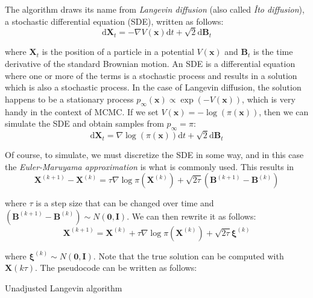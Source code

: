 \documentclass[12pt]{memoir}
\newcommand{\mb}{\mathbf}
\newcommand{\ti}{\textit}
\begin{document}
The algorithm draws its name from \ti{Langevin diffusion} (also called \ti{Îto diffusion}), a stochastic differential equation (SDE), written as follows:
\begin{equation}
    \mathrm{d}\mb X_t = -\nabla V(\mb x)\mathrm{d}t + \sqrt{2}\mathrm{d}\mb B_t
\end{equation}

where $\mb X_t$ is the position of a particle in a potential $V(\mb x)$ and $\mb B_t$ is the time derivative of the standard Brownian motion. An SDE is a differential equation where one or more of the terms is a stochastic process and results in a solution which is also a stochastic process. In the case of Langevin diffusion, the solution happens to be a stationary process $p_{\infty}(\mb x) \propto \exp(-V(\mb x))$, which is very handy in the context of MCMC. If we set $V(\mb x) = -\log(\pi(\mb x))$, then we can simulate the SDE and obtain samples from $p_\infty = \pi$:
\begin{equation}    
    \mathrm{d}\mb X_t = \nabla \log(\pi(\mb x))\mathrm{d}t + \sqrt{2}\mathrm{d}\mb B_t
\end{equation}


Of course, to simulate, we must discretize the SDE in some way, and in this case the \textit{Euler-Maruyama approximation} is what is commonly used. This results in
\begin{equation}
    \mb X^{(k+1)} - \mb X^{(k)} = \tau \nabla \log\pi(\mb X^{(k)}) + \sqrt{2\tau}(\mb B^{(k+1)} - \mb B^{(k)})
\end{equation}

where $\tau$ is a step size that can be changed over time and $(\mb B^{(k+1)} - \mb B^{(k)}) \sim N(\mb 0, \mb I)$. We can then rewrite it as follows:
\begin{equation}
    \mb X^{(k+1)} = \mb X^{(k)} + \tau \nabla \log\pi(\mb X^{(k)}) + \sqrt{2\tau}\boldsymbol{\xi}^{(k)}
\end{equation}

where $\boldsymbol{\xi}^{(k)} \sim N(\mb 0, \mb I)$. Note that the true solution can be computed with $\mb X(k\tau)$. The pseudocode can be written as follows:\medbreak

\begin{algorithm}[H]

    \DontPrintSemicolon




    \Input{$\mb x^{(0)}, K, \tau^{(1)}, \dots, \tau^{(K)}$}

    \Output{$\mb x^{(1)}, \mb x^{(2)}, \dots, \mb x^{(K)}$}

    \For{$k\gets 1:K$}{

        $\boldsymbol{\xi}^{(k)} \sim N(\mb 0, \mb I)$\;

        $\mb x^{(k+1)} = \mb x^{(k)} + \tau^{(k)} \nabla \log\pi(\mb x^{(k)}) + \sqrt{2\tau^{(k)}}\boldsymbol{\xi}^{(k)}$\;

    }

    \caption{Unadjusted Langevin algorithm}

\end{algorithm}
\end{document}
